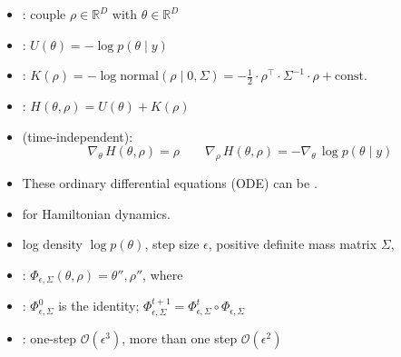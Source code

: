 \documentclass[10pt]{report}
\begin{document}
\begin{itemize}
\item {}: couple  $\rho \in
  \mathbb{R}^D$ with  $\theta \in \mathbb{R}^D$
\item {}: $U(\theta) = -\log p(\theta \mid y)$
\item {}: $K(\rho) = -\log \textrm{normal}(\rho
  \mid 0, \Sigma) = -\frac{1}{2} \cdot \rho^{\top} \cdot \Sigma^{-1} \cdot
  \rho + \textrm{const.}$
\item {}: $H(\theta, \rho) = U(\theta) + K(\rho)$
\item {} (time-independent):
  $$
  \nabla_\theta \, H(\theta, \rho) = \rho
  \qquad
  \nabla_\rho \, H(\theta, \rho) = -\nabla_{\theta} \, \log
  p(\theta \mid y)
  $$
\item These ordinary differential equations (ODE) can be .
\end{itemize}

\begin{itemize}
\item {} for Hamiltonian dynamics.
\item {} log density $\log p(\theta)$, step size
  $\epsilon$, positive definite mass matrix $\Sigma$, 
\item {}: $\Phi_{\epsilon, \Sigma}(\theta, \rho) = \theta'', \rho''$, where
\item {}: $\Phi^0_{\epsilon, \Sigma}$ is the
  identity; \quad $\Phi^{t + 1}_{\epsilon, \Sigma} = \Phi^t_{\epsilon,\Sigma} \circ
  \Phi_{\epsilon,\Sigma}$
\item {}: one-step $\mathcal{O}(\epsilon^3)$, more than
  one step $\mathcal{O}(\epsilon^2)$
\end{itemize}
\end{document}
